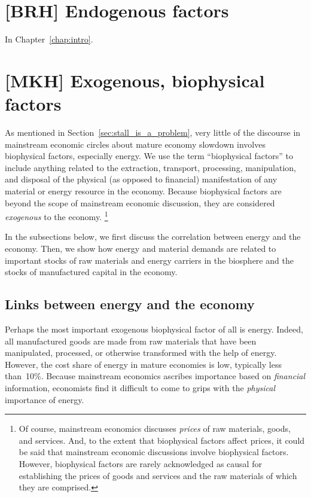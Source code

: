 \section{[BRH] Endogenous factors}
\label{sec:endogenous_factors}

In Chapter~\ref{chap:intro}.


\section{[MKH] Exogenous, biophysical factors}
\label{sec:exogenous_factors}

As mentioned in Section~\ref{sec:stall_is_a_problem}, 
very little of the discourse in mainstream economic circles
about mature economy slowdown 
involves biophysical factors, especially energy.
We use the term ``biophysical factors''
to include anything related to 
the extraction, transport, processing, manipulation, and disposal 
of the physical (as opposed to financial) manifestation 
of any material or energy resource in the economy.
Because biophysical factors are beyond the scope of mainstream economic discussion,
they are considered \emph{exogenous} to the economy.%
	\footnote{
	Of course, mainstream economics discusses \emph{prices}
	of raw materials, goods, and services. 
	And, to the extent that biophysical factors affect prices,
	it could be said that mainstream economic discussions involve
	biophysical factors.
	However, biophysical factors are rarely acknowledged as causal 
	for establishing the prices of goods and services and the raw materials 
	of which they are comprised.
	}

In the subsections below,
we first discuss the correlation between energy and the economy.
Then, we show how energy and material demands
are related to important stocks 
of raw materials and energy carriers in the biosphere 
and the stocks of manufactured capital in the economy.


\subsection{Links between energy and the economy}
\label{sec:energy-economy_links}

Perhaps the most important exogenous biophysical factor of all is energy. 
Indeed, all manufactured goods are made from raw materials that have been
manipulated, processed, or otherwise transformed with the help of energy.
However, the cost share of energy in mature economies is low, typically less than~10\%.
Because mainstream economics ascribes importance based on \emph{financial} information,%
economists find it difficult to come to grips with the \emph{physical} importance of energy.

